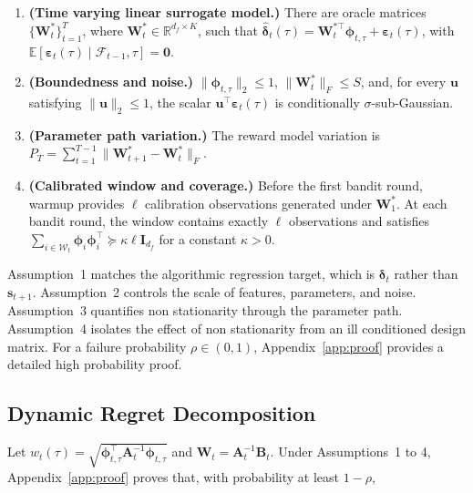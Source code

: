\documentclass{article} %
\begin{document}
\begin{enumerate}
    \item \textbf{(Time varying linear surrogate model.)} There are oracle matrices \(\{\mathbf{W}_t^*\}_{t=1}^{T}\), where \(\mathbf{W}_t^*\in\mathbb{R}^{d_f\times K}\), such that \(\widehat{\boldsymbol{\delta}}_t(\tau)=\mathbf{W}_t^{*\top}\boldsymbol{\phi}_{t,\tau}+\boldsymbol{\varepsilon}_t(\tau)\), with \(\mathbb{E}[\boldsymbol{\varepsilon}_t(\tau)\mid\mathcal{F}_{t-1},\tau]=\mathbf{0}\).
    \item \textbf{(Boundedness and noise.)} \(\lVert\boldsymbol{\phi}_{t,\tau}\rVert_2\leq1\), \(\lVert\mathbf{W}_t^*\rVert_F\leq S\), and, for every \(\mathbf{u}\) satisfying \(\lVert\mathbf{u}\rVert_2\leq1\), the scalar \(\mathbf{u}^\top\boldsymbol{\varepsilon}_t(\tau)\) is conditionally \(\sigma\)-sub-Gaussian.
    \item \textbf{(Parameter path variation.)} The reward model variation is \(P_T=\sum_{t=1}^{T-1}\lVert\mathbf{W}_{t+1}^*-\mathbf{W}_t^*\rVert_F\).
    \item \textbf{(Calibrated window and coverage.)} Before the first bandit round, warmup provides \(\ell\) calibration observations generated under \(\mathbf{W}_1^*\). At each bandit round, the window contains exactly \(\ell\) observations and satisfies \(\sum_{i\in\mathcal{W}_t}\boldsymbol{\phi}_i\boldsymbol{\phi}_i^\top\succeq\kappa\ell\mathbf{I}_{d_f}\) for a constant \(\kappa>0\).
\end{enumerate}

Assumption~1 matches the algorithmic regression target, which is \(\boldsymbol{\delta}_t\) rather than \(\mathbf{s}_{t+1}\). Assumption~2 controls the scale of features, parameters, and noise. Assumption~3 quantifies non stationarity through the parameter path. Assumption~4 isolates the effect of non stationarity from an ill conditioned design matrix. For a failure probability \(\rho\in(0,1)\), Appendix~\ref{app:proof} provides a detailed high probability proof.

\subsection{Dynamic Regret Decomposition}

Let \(w_t(\tau)=\sqrt{\boldsymbol{\phi}_{t,\tau}^\top\mathbf{A}_t^{-1}\boldsymbol{\phi}_{t,\tau}}\) and \(\widehat{\mathbf{W}}_t=\mathbf{A}_t^{-1}\mathbf{B}_t\). Under Assumptions~1 to 4, Appendix~\ref{app:proof} proves that, with probability at least \(1-\rho\),
\end{document}
